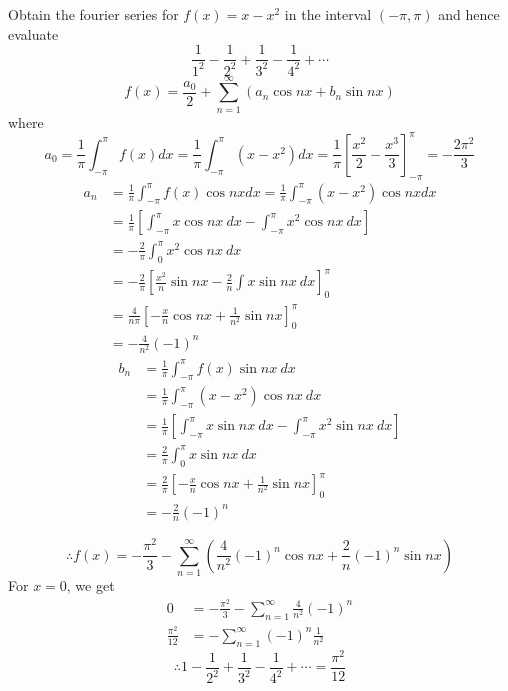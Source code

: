 \documentclass[12pt]{article}
\begin{document}
\begin{example}{Obtain the fourier series for $f(x) = x - x^2$ in the interval $(-\pi, \pi)$ and hence evaluate \[
    \frac{1}{1^2} - \frac{1}{2^2} + \frac{1}{3^2} - \frac{1}{4^2} + \cdots
\]}{}
    \[
        f(x) = \frac{a_0}{2} + \sum_{n=1}^{\infty} \left( a_n \cos{nx} + b_n \sin{nx} \right)
    \] where \[
        a_0 = \frac{1}{\pi} \int_{-\pi}^{\pi} f(x) dx = \frac{1}{\pi} \int_{-\pi}^{\pi} (x - x^2) dx = \frac{1}{\pi} \left[ \frac{x^2}{2} - \frac{x^3}{3} \right]_{-\pi}^{\pi} = -\frac{2\pi^2}{3}
    \]
    \begin{align*}
        a_n &= \frac{1}{\pi} \int_{-\pi}^{\pi} f(x) \cos{nx} dx = \frac{1}{\pi} \int_{-\pi}^{\pi} (x - x^2) \cos{nx} dx \\
        &= \frac{1}{\pi} \left[ \int_{-\pi}^{\pi} {x \cos{nx}} \: d{x} - \int_{-\pi}^{\pi} {x^2 \cos{nx}} \: d{x} \right] \\
        &= -\frac{2}{\pi} \int_{0}^{\pi} {x^2 \cos{nx}} \: d{x} \\
        &= -\frac{2}{\pi} \left[ \frac{x^2}{n} \sin{nx} - \frac{2}{n} \int{x \sin{nx}} \: d{x} \right]_{0}^{\pi} \\
        &= \frac{4}{n\pi} \left[ -\frac{x}{n} \cos{nx} + \frac{1}{n^2} \sin{nx} \right]_{0}^{\pi} \\
        &= -\frac{4}{n^2} (-1)^{n}
    \end{align*}
    \begin{align*}
        b_n &= \frac{1}{\pi} \int_{-\pi}^{\pi} {f(x) \sin{nx}} \: d{x} \\
        &= \frac{1}{\pi} \int_{-\pi}^{\pi} {(x-x^2) \cos{nx}} \: d{x} \\
        &= \frac{1}{\pi} \left[ \int_{-\pi}^{\pi} {x \sin{nx}} \: d{x} - \int_{-\pi}^{\pi} {x^2 \sin{nx}} \: d{x} \right] \\
        &= \frac{2}{\pi} \int_{0}^{\pi} {x \sin{nx}} \: d{x} \\
        &= \frac{2}{\pi} \left[ -\frac{x}{n} \cos{nx} + \frac{1}{n^2} \sin{nx} \right]_{0}^{\pi} \\
        &= - \frac{2}{n} (-1)^{n}
    \end{align*}

    \[
        \therefore f(x) = -\frac{\pi^2}{3} - \sum_{n=1}^{\infty} \left( \frac{4}{n^2} (-1)^{n} \cos{nx} + \frac{2}{n} (-1)^{n} \sin{nx} \right)
    \]
    For $x=0$, we get
    \begin{align*}
        0 &= -\frac{\pi^2}{3} - \sum_{n=1}^{\infty} \frac{4}{n^2} (-1)^n \\
        \frac{\pi^2}{12} &= - \sum_{n=1}^{\infty} (-1)^n \frac{1}{n^2}
    \end{align*}
    \[
        \boxed{ \therefore 1 - \frac{1}{2^2} + \frac{1}{3^2} - \frac{1}{4^2} + \cdots = \frac{\pi^2}{12} }
    \]
\end{example}
\end{document}
